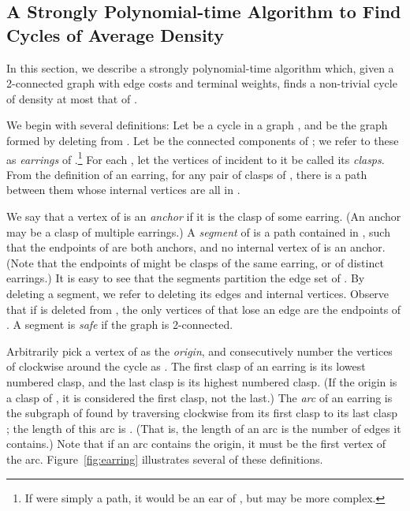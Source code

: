 \documentclass[11pt]{article}
\begin{document}
\subsection{A Strongly Polynomial-time Algorithm to Find Cycles of Average
  Density}\label{subsec:strong}

In this section, we describe a strongly polynomial-time algorithm
which, given a 2-connected graph  with edge costs and terminal
weights, finds a non-trivial cycle of density at most that of .

We begin with several definitions: Let  be a cycle in a graph ,
and  be the graph formed by deleting  from . Let  be the connected components of ; we refer to these as
\emph{earrings} of .\footnote{If  were simply a path, it would be an
  ear of , but  may be more complex.}  For each , let the
vertices of  incident to it be called its \emph{clasps}. From the
definition of an earring, for any pair of clasps of , there is a
path between them whose internal vertices are all in . 

We say that a vertex of  is an \emph{anchor} if it is the clasp of
some earring. (An anchor may be a clasp of multiple earrings.)  A
\emph{segment}  of  is a path contained in , such that the
endpoints of  are both anchors, and no internal vertex of  is an
anchor. (Note that the endpoints of  might be clasps of the same
earring, or of distinct earrings.) It is easy to see that the segments
partition the edge set of . By deleting a segment, we refer to
deleting its edges and internal vertices. Observe that if  is
deleted from , the only vertices of  that lose an edge are
the endpoints of . A segment is \emph{safe} if the graph  is
2-connected.

Arbitrarily pick a vertex  of  as the \emph{origin}, and
consecutively number the vertices of  clockwise around the cycle as
. The first clasp of an earring
 is its lowest numbered clasp, and the last clasp is its highest
numbered clasp. (If the origin is a clasp of , it is considered the
first clasp, not the last.) The \emph{arc} of an earring is the
subgraph of  found by traversing clockwise from its first clasp
 to its last clasp ; the length of this arc is . (That
is, the length of an arc is the number of edges it contains.) Note
that if an arc contains the origin, it must be the first vertex of the
arc.  Figure~\ref{fig:earring} illustrates several of these
definitions.
\end{document}
